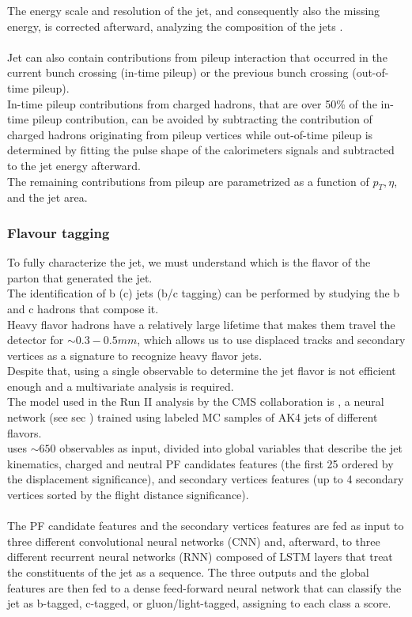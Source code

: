 The energy scale and resolution of the jet, and consequently also the missing energy, is corrected afterward, analyzing the composition of the jets  \cite{Khachatryan2017JetTeV}.\\
\\
Jet can also contain contributions from pileup interaction that occurred in the current bunch crossing (in-time pileup) or the previous bunch crossing (out-of-time pileup).\\
In-time pileup contributions from charged hadrons, that are over 50\% of the in-time pileup contribution, can be avoided by subtracting the contribution of charged hadrons originating from pileup vertices while out-of-time pileup is determined by fitting the pulse shape of the calorimeters signals and subtracted to the jet energy afterward.\\
The remaining contributions from pileup are parametrized as a function of $p_T, \eta$, and the jet area.

\subsubsection*{Flavour tagging}
To fully characterize the jet, we must understand which is the flavor of the parton that generated the jet.\\
The identification of b (c) jets (b/c tagging) can be performed by studying the b and c hadrons that compose it.\\
Heavy flavor hadrons have a relatively large lifetime that makes them travel the detector for $\sim 0.3-0.5mm$, which allows us to use displaced tracks and secondary vertices as a signature to recognize heavy flavor jets.\\
Despite that, using a single observable to determine the jet flavor is not efficient enough and a multivariate analysis is required.\\
The model used in the Run II analysis by the CMS collaboration is \DeepJet \cite{Bols2020JetDeepJet}, a neural network (see sec \ADDREF) trained using labeled MC samples of AK4 jets of different flavors.\\
\DeepJet uses $\sim 650$ observables as input, divided into global variables that describe the jet kinematics, charged and neutral PF candidates features (the first 25 ordered by the displacement significance), and secondary vertices features (up to 4 secondary vertices sorted by the flight distance significance).\\
\\
The PF candidate features and the secondary vertices features are fed as input to three different convolutional neural networks (CNN) \cite{OShea2015AnNetworks} and, afterward, to three different recurrent neural networks (RNN) composed of LSTM layers \cite{Sherstinsky2018FundamentalsNetwork} that treat the constituents of the jet as a sequence. The three outputs and the global features are then fed to a dense feed-forward neural network that can classify the jet as b-tagged, c-tagged, or gluon/light-tagged, assigning to each class a score.

